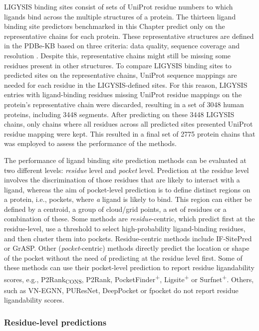 LIGYSIS binding sites consist of sets of UniProt residue numbers to which ligands bind across the multiple structures of a protein. The thirteen ligand binding site predictors benchmarked in this Chapter predict only on the representative chains for each protein. These representative structures are defined in the PDBe-KB based on three criteria: data quality, sequence coverage and resolution \cite{ELLAWAY_2024_CONFORMATIONS}. Despite this, representative chains might still be missing some residues present in other structures. To compare LIGYSIS binding sites to predicted sites on the representative chains, UniProt sequence mappings are needed for each residue in the LIGYSIS-defined sites. For this reason, LIGYSIS entries with ligand-binding residues missing UniProt residue mappings on the protein's representative chain were discarded, resulting
in a set of 3048 human proteins, including 3448 segments. After predicting on these 3448 LIGYSIS chains, only chains where all residues across all predicted sites presented UniProt residue mapping were kept. This resulted in a final set of 2775 protein chains that was employed to assess the performance of the methods.

The performance of ligand binding site prediction methods can be evaluated at two different levels: \textit{residue} level and \textit{pocket} level. Prediction at the residue level involves the discrimination of those residues that are likely to interact with a ligand, whereas the aim of pocket-level prediction is to define distinct regions on a protein, i.e., pockets, where \textit{a} ligand is likely to bind. This region can either be defined by a centroid, a group of cloud/grid points, a set of residues or a combination of these. Some methods are \textit{residue}-centric, which predict first at the residue-level, use a threshold to select high-probability ligand-binding residues, and then cluster them into pockets. Residue-centric methods include IF-SitePred or GrASP. Other (\textit{pocket}-centric) methods directly predict the location or shape of the pocket without the need of predicting at the residue level first. Some of these methods can use their pocket-level prediction to report residue ligandability scores, e.g., P2Rank\textsubscript{CONS}, P2Rank, PocketFinder\textsuperscript{+}, Ligsite\textsuperscript{+} or Surfnet\textsuperscript{+}. Others, such as VN-EGNN, PUResNet, DeepPocket or fpocket do not report residue ligandability scores.

\FloatBarrier

\subsubsection{Residue-level predictions}

